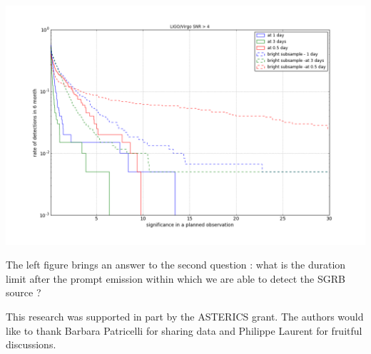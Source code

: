 \documentclass[a0,portrait]{a0poster}
\begin{document}
\begin{multicols}{2}
\begin{center}\vspace{.5cm}
    \includegraphics[width=20cm]{figures/significance_vs_rate_af.png}
    \label{covered_region}
\end{center}

The left figure brings an answer to the second question : what is the duration
limit after the prompt emission within which we are able to detect the SGRB
source ?





\vspace{10mm}

{\footnotesize 
  This research was supported in part by the ASTERICS grant. The authors would like to thank Barbara Patricelli for sharing data and Philippe Laurent for fruitful discussions. }


\end{multicols}
\end{document}
